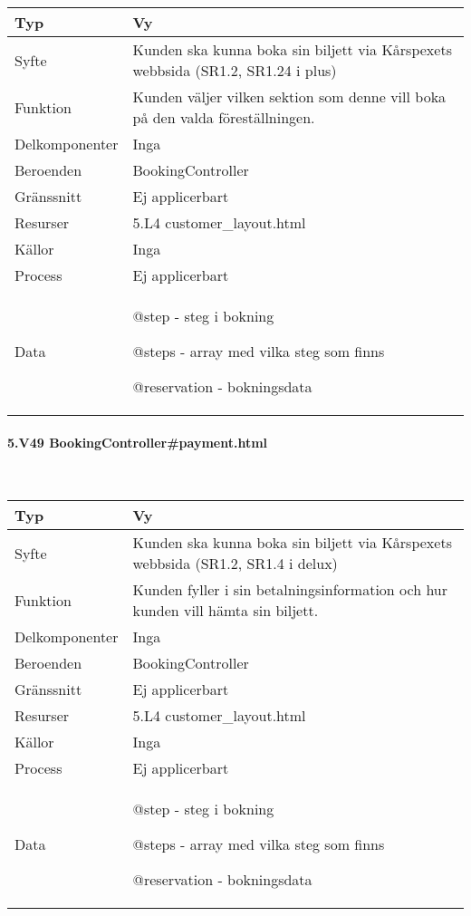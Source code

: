 \documentclass[a4paper, twoside, 11pt, titlepage]{article}
\begin{document}
			\begin {table} [ht] \begin{tabular} {  p{3.5cm} p{9.6cm} }
				\hline
				{Typ} & {Vy} \\
				\hline
				{Syfte} & {Kunden ska kunna boka sin biljett via Kårspexets webbsida (SR1.2, SR1.24 i  plus)} \\
				\hline
				{Funktion} & {Kunden väljer vilken sektion som denne vill boka på den valda föreställningen.} \\
				\hline
				{Delkomponenter} & {Inga} \\
				\hline
				{Beroenden} & {BookingController} \\
				\hline
				{Gränssnitt} & {Ej applicerbart} \\
				\hline
				{Resurser} & {5.L4 customer\_layout.html} \\
				\hline
				{Källor} & {Inga} \\
				\hline
				{Process} & {Ej applicerbart} \\
				\hline
				{Data} & {@step - steg i bokning

@steps - array med vilka steg som finns

@reservation - bokningsdata} \\
				\hline
			\end{tabular} \end{table} \FloatBarrier


			\paragraph{5.V49 BookingController\#payment.html}\

			\begin {table} [ht] \begin{tabular} {  p{3.5cm} p{9.6cm} }
				\hline
				{Typ} & {Vy} \\
				\hline
				{Syfte} & {Kunden ska kunna boka sin biljett via Kårspexets webbsida (SR1.2, SR1.4 i delux)} \\
				\hline
				{Funktion} & {Kunden fyller i sin betalningsinformation och hur kunden vill hämta sin biljett.} \\
				\hline
				{Delkomponenter} & {Inga} \\
				\hline
				{Beroenden} & {BookingController} \\
				\hline
				{Gränssnitt} & {Ej applicerbart} \\
				\hline
				{Resurser} & {5.L4 customer\_layout.html} \\
				\hline
				{Källor} & {Inga} \\
				\hline
				{Process} & {Ej applicerbart} \\
				\hline
				{Data} & {@step - steg i bokning

@steps - array med vilka steg som finns

@reservation - bokningsdata} \\
				\hline
			\end{tabular} \end{table} \FloatBarrier
\end{document}
